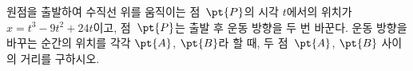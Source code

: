 원점을 출발하여 수직선 위를 움직이는 점~$\pt{P}$의 시각 $t$에서의 위치가 $x=t^3-9t^2+24t$이고, 점~$\pt{P}$는 출발 후 운동 방향을 두 번 바꾼다. 운동 방향을 바꾸는 순간의 위치를 각각 $\pt{A}$, $\pt{B}$라 할 때, 두 점~$\pt{A}$, $\pt{B}$ 사이의 거리를 구하시오.
